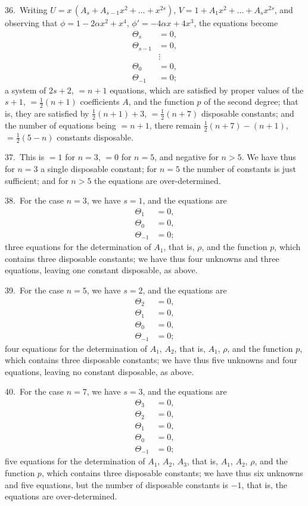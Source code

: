 \documentclass[12pt,a4paper]{article}
\theoremstyle{definition}
\begin{document}
36.\ Writing $U = x\, (A_s + A_{s-1} x^2 + \ldots + x^{2s})$, $V = 1 + A_1 x^2 + \ldots + A_s x^{2s}$,
and observing that $\phi = 1 - 2\alpha x^2 + x^4$, $\phi' = -4\alpha x + 4x^3$, the equations become
\begin{align*}
\Theta_s &= 0,\\
\Theta_{s-1} &= 0,\\
&\vdots\\
\Theta_0 &= 0,\\
\Theta_{-1} &= 0;
\end{align*}
a system of $2s + 2$, $= n + 1$ equations, which are satisfied by proper values of the
$s + 1$, $= \tfrac12(n + 1)$ coefficients $A$, and the function $p$ of the second degree; that is, they
are satisfied by $\tfrac12(n + 1) + 3$, $= \tfrac12(n + 7)$ disposable constants; and the number of equations
being $= n + 1$, there remain $\tfrac12(n + 7) - (n + 1)$, $= \tfrac12(5 - n)$ constants disposable.

37.\ This is $= 1$ for $n = 3$, $= 0$ for $n = 5$, and negative for $n > 5$. We have thus
for $n = 3$ a single disposable constant; for $n = 5$ the number of constants is just
sufficient; and for $n > 5$ the equations are over-determined.

38.\ For the case $n = 3$, we have $s = 1$, and the equations are
\begin{align*}
\Theta_1 &= 0,\\
\Theta_0 &= 0,\\
\Theta_{-1} &= 0;
\end{align*}
three equations for the determination of $A_1$, that is, $\rho$, and the function $p$, which
contains three disposable constants; we have thus four unknowns and three equations,
leaving one constant disposable, as above.

39.\ For the case $n = 5$, we have $s = 2$, and the equations are
\begin{align*}
\Theta_2 &= 0,\\
\Theta_1 &= 0,\\
\Theta_0 &= 0,\\
\Theta_{-1} &= 0;
\end{align*}
four equations for the determination of $A_1$, $A_2$, that is, $A_1$, $\rho$, and the function $p$,
which contains three disposable constants; we have thus five unknowns and four equations,
leaving no constant disposable, as above.

40.\ For the case $n = 7$, we have $s = 3$, and the equations are
\begin{align*}
\Theta_3 &= 0,\\
\Theta_2 &= 0,\\
\Theta_1 &= 0,\\
\Theta_0 &= 0,\\
\Theta_{-1} &= 0;
\end{align*}
five equations for the determination of $A_1$, $A_2$, $A_3$, that is, $A_1$, $A_2$, $\rho$, and the
function $p$, which contains three disposable constants; we have thus six unknowns and
five equations, but the number of disposable constants is $-1$, that is, the equations are
over-determined.
\end{document}
